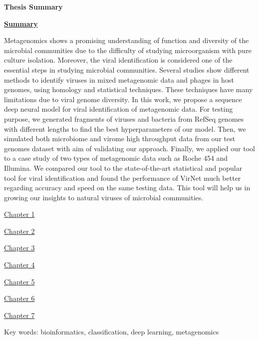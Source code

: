 \newpage
\thispagestyle{empty}


\begin{center}\huge \textbf{Thesis Summary}\end{center}


\begin{center}
\underline{\textbf{Summary}}
\end{center}
%

Metagenomics shows a promising understanding of function and diversity of the microbial communities due to the difficulty of studying microorganism with pure culture isolation. Moreover, the viral identification is considered one of the essential steps in studying microbial communities. Several studies show different methods to identify viruses in mixed metagenomic data and phages in host genomes, using homology and statistical techniques. These techniques have many limitations due to viral genome diversity. In this work, we propose a sequence deep neural model for viral identification of metagenomic data. For testing purpose, we generated fragments of viruses and bacteria from RefSeq genomes with different lengths to find the best hyperparameters of our model. Then, we simulated both microbiome and virome high throughput data from our test genomes dataset with aim of validating our approach. 
Finally, we applied our tool to a case study of two types of metagenomic data such as Roche 454 and Illumina.
We compared our tool to the state-of-the-art statistical and popular tool for viral identification and found the performance of VirNet much better regarding accuracy and speed on the same testing data. This tool will help us in growing our insights to natural viruses of microbial communities.

%
\begin{flushleft}
\underline{Chapter 1}
\end{flushleft}
%
%
%
%
\begin{flushleft}
\underline{Chapter 2}
\end{flushleft}
%
%
%
\begin{flushleft}
\underline{Chapter 3}
\end{flushleft}
%
%
%
\begin{flushleft}
\underline{Chapter 4}
\end{flushleft}
%
%
%
%
\begin{flushleft}
\underline{Chapter 5}
\end{flushleft}
%
%
%
\begin{flushleft}
\underline{Chapter 6}
\end{flushleft}
%
%
%
\begin{flushleft}
\underline{Chapter 7}
\end{flushleft}



\begin{flushleft}
\large

Key words: bioinformatics, classification, deep learning, metagenomics
\end{flushleft}



